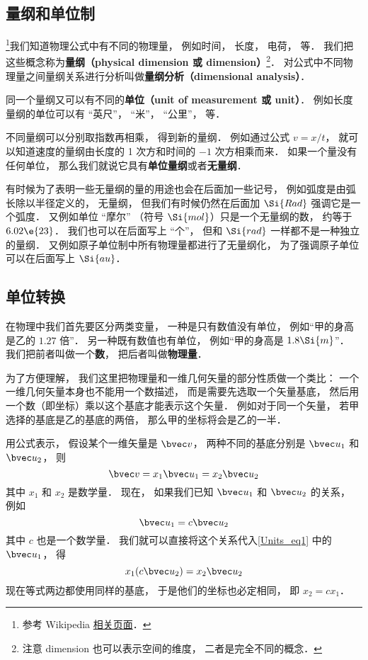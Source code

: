
\subsection{量纲和单位制}
\footnote{参考 Wikipedia \href{https://en.wikipedia.org/wiki/Dimensional_analysis}{相关页面}．}我们知道物理公式中有不同的物理量， 例如时间， 长度， 电荷， 等． 我们把这些概念称为\textbf{量纲（physical dimension 或 dimension）}\footnote{注意 dimension 也可以表示空间的维度， 二者是完全不同的概念．}． 对公式中不同物理量之间量纲关系进行分析叫做\textbf{量纲分析（dimensional analysis）}．

同一个量纲又可以有不同的\textbf{单位（unit of measurement 或 unit）}． 例如长度量纲的单位可以有 “英尺”， “米”， “公里”， 等．

不同量纲可以分别取指数再相乘， 得到新的量纲． 例如通过公式 $v = x/t$， 就可以知道速度的量纲由长度的 1 次方和时间的 $-1$ 次方相乘而来． 如果一个量没有任何单位， 那么我们就说它具有\textbf{单位量纲}或者\textbf{无量纲}．

有时候为了表明一些无量纲的量的用途也会在后面加一些记号， 例如弧度是由弧长除以半径定义的， 无量纲， 但我们有时候仍然在后面加 $\Si{Rad}$ 强调它是一个弧度． 又例如单位 “摩尔” （符号 $\Si{mol}$）只是一个无量纲的数， 约等于 $6.02\e{23}$． 我们也可以在后面写上 “个”， 但和 $\Si{rad}$ 一样都不是一种独立的量纲． 又例如原子单位制中所有物理量都进行了无量纲化， 为了强调原子单位可以在后面写上 $\Si{au}$．

\subsection{单位转换}


在物理中我们首先要区分两类变量， 一种是只有数值没有单位， 例如“甲的身高是乙的 $1.27$ 倍”． 另一种既有数值也有单位， 例如“甲的身高是 $1.8\Si{m}$”． 我们把前者叫做一个\textbf{数}， 把后者叫做\textbf{物理量}．

为了方便理解， 我们这里把物理量和一维几何矢量的部分性质做一个类比： 一个一维几何矢量本身也不能用一个数描述， 而是需要先选取一个矢量基底， 然后用一个数（即坐标）乘以这个基底才能表示这个矢量． 例如对于同一个矢量， 若甲选择的基底是乙的基底的两倍， 那么甲的坐标将会是乙的一半．

用公式表示， 假设某个一维矢量是 $\bvec v$， 两种不同的基底分别是 $\bvec u_1$ 和 $\bvec u_2$， 则
\begin{equation}\label{Units_eq1}
\bvec v = x_1 \bvec u_1 = x_2 \bvec u_2
\end{equation}
其中 $x_1$ 和 $x_2$ 是数学量． 现在， 如果我们已知 $\bvec u_1$ 和 $\bvec u_2$ 的关系， 例如
\begin{equation}\label{Units_eq2}
\bvec u_1 = c \bvec u_2
\end{equation}
其中 $c$ 也是一个数学量． 我们就可以直接将这个关系代入\autoref{Units_eq1} 中的 $\bvec u_1$， 得
\begin{equation}
x_1 (c \bvec u_2) = x_2 \bvec u_2
\end{equation}
现在等式两边都使用同样的基底， 于是他们的坐标也必定相同， 即 $x_2 = c x_1$．

